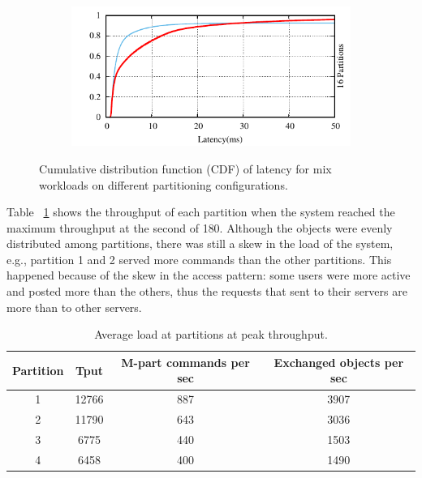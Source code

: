 \begin{figure}[ht!]
\begin{subfigure}{0.48\columnwidth}
  \end{subfigure}
  \begin{subfigure}{0.48\columnwidth}
    \centering
    \includegraphics[width=\textwidth]{./figures/experiments/dynastar/chirper-latency-cdf-16p.pdf}
  \end{subfigure}
  \caption{Cumulative distribution function (CDF) of latency for mix workloads on different partitioning configurations.}
  \label{fig:dynastar-socialcdf}
\end{figure}


Table ~\ref{table:dynastar-socialsnapshot} shows the throughput of each
partition when the system reached the maximum throughput at the second of 180.
Although the objects were evenly distributed among partitions, there was still a
skew in the load of the system, e.g., partition 1 and 2 served more commands
than the other partitions. This happened because of the skew in the access
pattern: some users were more active and posted more than the others, thus the
requests that sent to their servers are more than to other servers.

\begin{table}[htp]
\caption{Average load at partitions at peak throughput.}
\label{table:dynastar-socialsnapshot}
\begin{adjustbox}{max width=\columnwidth}
\vspace{10mm}
\begin{tabular}{|c|c|c|c|}
\hline
Partition & Tput & M-part commands per sec & Exchanged objects per sec \\ \hline
1         & 12766      & 887                      & 3907              \\ \hline
2         & 11790      & 643                      & 3036              \\ \hline
3         & 6775       & 440                      & 1503              \\ \hline
4         & 6458       & 400                      & 1490              \\ \hline
\end{tabular}
\vspace{10mm}
\end{adjustbox}
\end{table}

